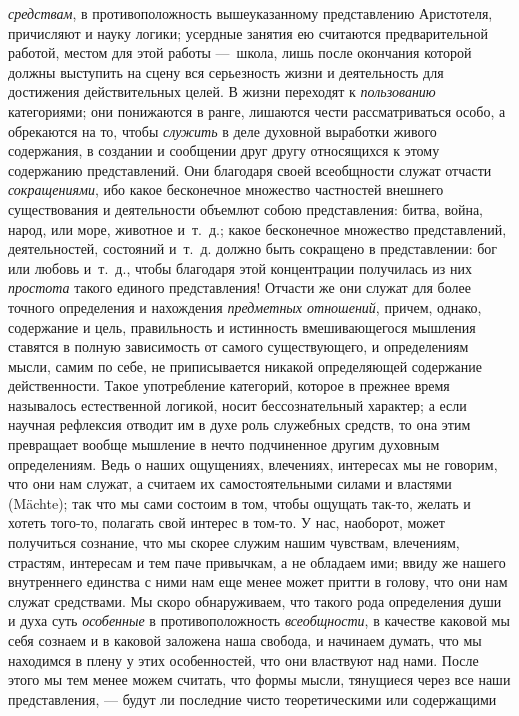 {\em средствам}, в противоположность вышеуказанному
представлению Аристотеля, причисляют и науку логики; усердные занятия ею
считаются предварительной работой, местом для этой работы —~школа, лишь
после окончания которой должны выступить на сцену вся серьезность жизни и
деятельность для достижения действительных целей. В жизни переходят к
{\em пользованию} категориями; они понижаются в ранге,
лишаются чести рассматриваться особо, а обрекаются на то, чтобы
{\em служить} в деле духовной выработки живого
содержания, в создании и сообщении друг другу относящихся к этому
содержанию представлений. Они благодаря своей всеобщности служат отчасти
{\em сокращениями}, ибо какое бесконечное множество
частностей внешнего существования и деятельности объемлют собою
представления: битва, война, народ, или море, животное и~т.~д.; какое
бесконечное множество представлений, деятельностей, состояний и~т.~д.
должно быть сокращено в представлении: бог или любовь и~т.~д., чтобы
благодаря этой концентрации получилась из них
{\em простота} такого единого представления! Отчасти же
они служат для более точного определения и нахождения
{\em предметных отношений}, причем, однако, содержание
и цель, правильность и истинность вмешивающегося мышления ставятся в полную
зависимость от самого существующего, и определениям мысли, самим по себе,
не приписывается никакой определяющей содержание действенности. Такое
употребление категорий, которое в прежнее время называлось естественной
логикой, носит бессознательный характер; а если научная рефлексия отводит
им в духе роль служебных средств, то она этим превращает вообще мышление в
нечто подчиненное другим духовным определениям. Ведь о наших ощущениях,
влечениях, интересах мы не говорим, что они нам служат, а считаем их
самостоятельными силами и властями (Mächte); так что мы сами состоим в том,
чтобы ощущать так-то, желать и хотеть того-то, полагать свой интерес в
том-то. У нас, наоборот, может получиться сознание, что мы скорее служим
нашим чувствам, влечениям, страстям, интересам и тем паче привычкам, а не
обладаем ими; ввиду же нашего внутреннего единства с ними нам еще менее
может притти в голову, что они нам служат средствами. Мы скоро
обнаруживаем, что такого рода определения души и духа суть
{\em особенные} в противоположность
{\em всеобщности}, в качестве каковой мы себя сознаем и
в каковой заложена наша свобода, и начинаем думать, что мы находимся в
плену у этих особенностей, что они властвуют над нами. После этого мы тем
менее можем считать, что формы мысли, тянущиеся через все наши
представления, — будут ли последние чисто теоретическими или содержащими
